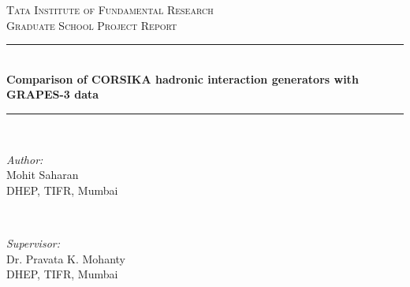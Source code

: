 \documentclass[12pt]{article}
\begin{document}
\begin{titlepage}

\newcommand{\HRule}{\rule{\linewidth}{0.5mm}} %

\center %
 

\textsc{\LARGE Tata Institute of Fundamental Research}\\[1.5cm] 
\textsc{\large Graduate School Project Report}\\[0.5cm] %
\vspace{5cm}

\HRule \\[0.4cm]
{ \huge \bfseries Comparison of CORSIKA hadronic interaction generators with GRAPES-3 data}\\[0.4cm] %
\HRule \\[3.0cm]
 

\vspace{4cm}

\begin{minipage}{0.4\textwidth}
\begin{flushleft} \large
\emph{Author:}\\
Mohit Saharan\\
DHEP, TIFR, Mumbai
\end{flushleft}
\end{minipage}
~
\begin{minipage}{0.4\textwidth}
\begin{flushright} \large
\emph{Supervisor:} \\
Dr. Pravata K. Mohanty\\
DHEP, TIFR, Mumbai
\end{flushright}
\end{minipage}\\[2cm]


\end{titlepage}
\end{document}
